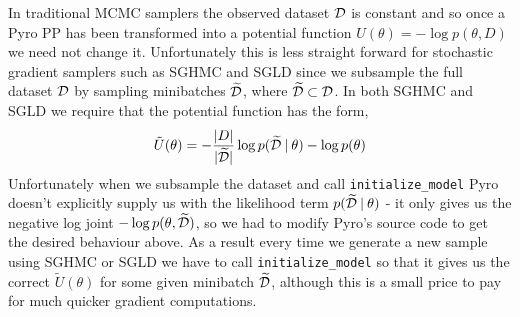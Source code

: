 In traditional MCMC samplers the observed dataset $\mathcal{D}$ is constant and so once a Pyro PP has been transformed into a potential function $U(\theta) = - \log p(\theta, D)$ we need not change it. Unfortunately this is less straight forward for stochastic gradient samplers such as SGHMC and SGLD since we subsample the full dataset $\mathcal{D}$ by sampling minibatches $\widetilde{\mathcal{D}}$, where $\widetilde{\mathcal{D}} \subset \mathcal{D}$. In both SGHMC and SGLD we require that the potential function has the form,
$$\tilde{U}(\theta) =  -\frac{|D|}{|\widetilde{\mathcal{D}}|} \log p(\widetilde{\mathcal{D}} \: | \: \theta) - \log p (\theta)$$
Unfortunately when we subsample the dataset and call \texttt{initialize\_model} Pyro doesn't explicitly supply us with the likelihood term $p(\widetilde{\mathcal{D}} \: | \: \theta)$ - it only gives us the negative log joint $- \log p(\theta, \widetilde{\mathcal{D}})$, so we had to modify Pyro's source code to get the desired behaviour above. As a result every time we generate a new sample using SGHMC or SGLD we have to call \texttt{initialize\_model} so that it gives us the correct $\tilde{U}(\theta)$ for some given minibatch $\widetilde{\mathcal{D}}$, although this is a small price to pay for much quicker gradient computations.